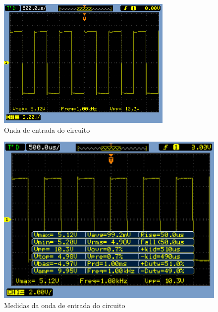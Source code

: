 \documentclass[a4paper]{article} %
\begin{document}
\begin{figure}[h!]
\begin{centering}
\includegraphics[scale=0.7]{Imagens/3.4duplicador_tensao/Vin} \caption{Onda de entrada do circuito\label{fig:q4-vin}}
\par\end{centering}
\end{figure}



\begin{figure}[h!]
\begin{centering}
\includegraphics[scale=0.7]{Imagens/3.4duplicador_tensao/Vinmedidas} \caption{Medidas da onda de entrada do circuito \label{fig:q4-vindata}}
\par\end{centering}
\end{figure}
\end{document}
